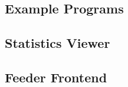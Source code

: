 \subsection{Example Programs}
\paragraph{}

\subsection{Statistics Viewer}
\paragraph{}

\subsection{Feeder Frontend}
\paragraph{}
